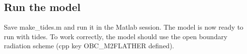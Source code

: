 \subsection{Run the model}

Save make\_tides.m and run it in the Matlab session. The model is now ready to run 
with tides. To work correctly, the model should use the \citet{Fla76} open boundary 
radiation scheme (cpp key OBC\_M2FLATHER defined).
